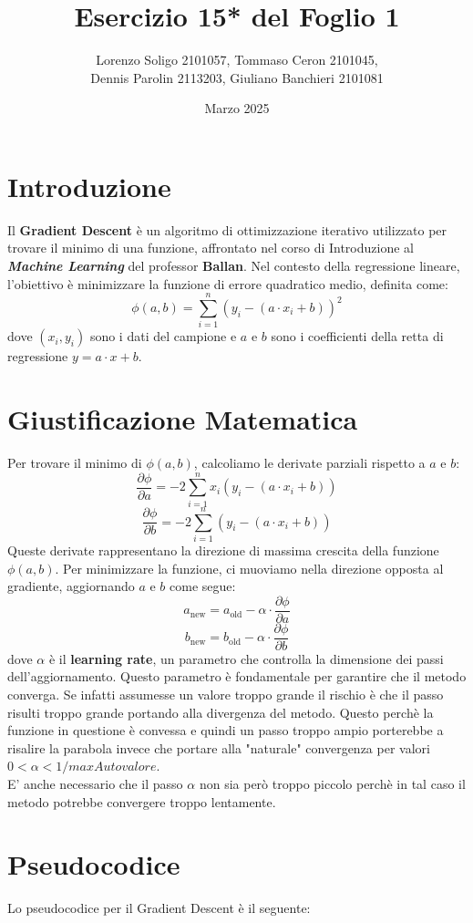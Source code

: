 \documentclass{article}
\title{Esercizio 15* del Foglio 1}
\author{Lorenzo Soligo 2101057, Tommaso Ceron 2101045,\\ Dennis Parolin 2113203, Giuliano Banchieri 2101081}
\date{Marzo 2025}
\begin{document}
\maketitle

\section{Introduzione}
Il \textbf{Gradient Descent} è un algoritmo di ottimizzazione iterativo utilizzato per trovare il minimo di una funzione, affrontato nel corso di Introduzione al \textbf{\textit{Machine Learning}} del professor \textbf{Ballan}. Nel contesto della regressione lineare, l'obiettivo è minimizzare la funzione di errore quadratico medio, definita come:
\[
\phi(a, b) = \sum_{i=1}^n (y_i - (a \cdot x_i + b))^2
\]
dove \((x_i, y_i)\) sono i dati del campione e \(a\) e \(b\) sono i coefficienti della retta di regressione \(y = a \cdot x + b\).

\section{Giustificazione Matematica}
Per trovare il minimo di \(\phi(a, b)\), calcoliamo le derivate parziali rispetto a \(a\) e \(b\):
\[
\frac{\partial \phi}{\partial a} = -2 \sum_{i=1}^n x_i (y_i - (a \cdot x_i + b))
\]
\[
\frac{\partial \phi}{\partial b} = -2 \sum_{i=1}^n (y_i - (a \cdot x_i + b))
\]
Queste derivate rappresentano la direzione di massima crescita della funzione \(\phi(a, b)\). Per minimizzare la funzione, ci muoviamo nella direzione opposta al gradiente, aggiornando \(a\) e \(b\) come segue:
\[
a_{\text{new}} = a_{\text{old}} - \alpha \cdot \frac{\partial \phi}{\partial a}
\]
\[
b_{\text{new}} = b_{\text{old}} - \alpha \cdot \frac{\partial \phi}{\partial b}
\]
dove \(\alpha\) è il \textbf{learning rate}, un parametro che controlla la dimensione dei passi dell'aggiornamento. Questo parametro  è fondamentale per garantire che il metodo converga. Se infatti assumesse un valore troppo grande il rischio è che il passo risulti troppo grande portando alla divergenza del metodo. Questo perchè la funzione in questione è convessa e quindi un passo troppo ampio porterebbe a risalire la parabola invece che portare alla "naturale" convergenza per valori $0<\alpha<1/maxAutovalore$.\\
E' anche necessario che il passo $\alpha$ non sia però troppo piccolo perchè in tal caso il metodo potrebbe convergere troppo lentamente.

\section{Pseudocodice}
Lo pseudocodice per il Gradient Descent è il seguente:
\end{document}
